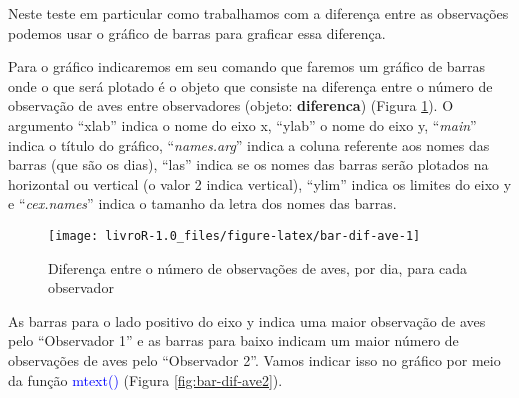 \documentclass[14pt,titlepage, oneside, openany, a4paper]{book}
\newenvironment{Shaded}{\begin{snugshade}}{\end{snugshade}}
\newcommand{\DataTypeTok}[1]{\textcolor[rgb]{0.13,0.29,0.53}{#1}}
\newcommand{\DecValTok}[1]{\textcolor[rgb]{0.00,0.00,0.81}{#1}}
\newcommand{\FloatTok}[1]{\textcolor[rgb]{0.00,0.00,0.81}{#1}}
\newcommand{\KeywordTok}[1]{\textcolor[rgb]{0.13,0.29,0.53}{\textbf{#1}}}
\newcommand{\NormalTok}[1]{#1}
\newcommand{\OperatorTok}[1]{\textcolor[rgb]{0.81,0.36,0.00}{\textbf{#1}}}
\newcommand{\StringTok}[1]{\textcolor[rgb]{0.31,0.60,0.02}{#1}}
\begin{document}
Neste teste em particular como trabalhamos com a diferença entre as observações podemos usar o gráfico de barras para graficar essa diferença.

Para o gráfico indicaremos em seu comando que faremos um gráfico de barras onde o que será plotado é o objeto que consiste na diferença entre o número de observação de aves entre observadores (objeto: \textbf{diferenca}) (Figura \ref{fig:bar-dif-ave}). O argumento ``xlab'' indica o nome do eixo x, ``ylab'' o nome do eixo y, ``\emph{main}'' indica o título do gráfico, ``\emph{names.arg}'' indica a coluna referente aos nomes das barras (que são os dias), ``las'' indica se os nomes das barras serão plotados na horizontal ou vertical (o valor 2 indica vertical), ``ylim'' indica os limites do eixo y e ``\emph{cex.names}'' indica o tamanho da letra dos nomes das barras.

\begin{Shaded}
\end{Shaded}

\begin{figure}[H]

{\centering \texttt{[image: livroR-1.0\_files/figure-latex/bar-dif-ave-1]} 

}

\caption{Diferença entre o número de observações de aves, por dia, para cada observador}\label{fig:bar-dif-ave}
\end{figure}

As barras para o lado positivo do eixo y indica uma maior observação de aves pelo ``Observador 1'' e as barras para baixo indicam um maior número de observações de aves pelo ``Observador 2''. Vamos indicar isso no gráfico por meio da função \textcolor{blue}{mtext()} (Figura \ref{fig:bar-dif-ave2}).
\end{document}
